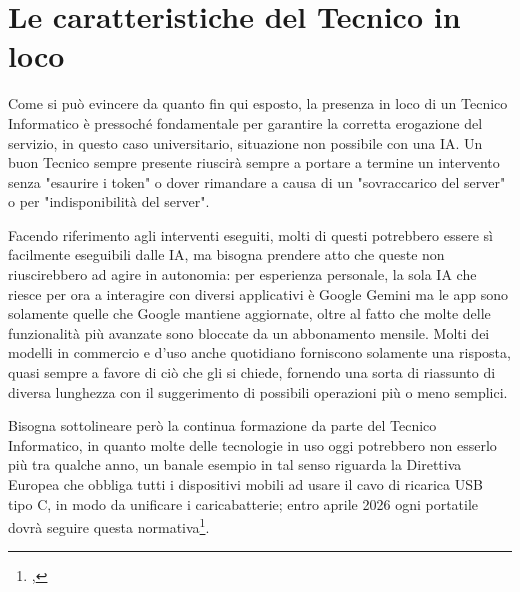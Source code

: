         \section{Le caratteristiche del Tecnico in loco}
            \par
                Come si può evincere da quanto fin qui esposto, la presenza in loco di un Tecnico Informatico è pressoché fondamentale per garantire la corretta erogazione del servizio, in questo caso universitario, situazione non possibile con una IA. \newline
                Un buon Tecnico sempre presente riuscirà sempre a portare a termine un intervento senza "esaurire i token" o dover rimandare a causa di un "sovraccarico del server" o per "indisponibilità del server". 
            \par
                Facendo riferimento agli interventi eseguiti, molti di questi potrebbero essere sì facilmente eseguibili dalle IA, ma bisogna prendere atto che queste non riuscirebbero ad agire in autonomia: per esperienza personale, la sola IA che riesce per ora a interagire con diversi applicativi è Google Gemini ma le app sono solamente quelle che Google mantiene aggiornate, oltre al fatto che molte delle funzionalità più avanzate sono bloccate da un abbonamento mensile. Molti dei modelli in commercio e d'uso anche quotidiano forniscono solamente una risposta, quasi sempre a favore di ciò che gli si chiede, fornendo una sorta di riassunto di diversa lunghezza con il suggerimento di possibili operazioni più o meno semplici.
            \par
                Bisogna sottolineare però la continua formazione da parte del Tecnico Informatico, in quanto molte delle tecnologie in uso oggi potrebbero non esserlo più tra qualche anno, un banale esempio in tal senso riguarda la Direttiva Europea che obbliga tutti i dispositivi mobili ad usare il cavo di ricarica USB tipo C, in modo da unificare i caricabatterie; entro aprile 2026 ogni portatile dovrà seguire questa normativa\footnote{\cite{DirettivaUE_2022/2380},\cite{EU-USB-C}}. 
